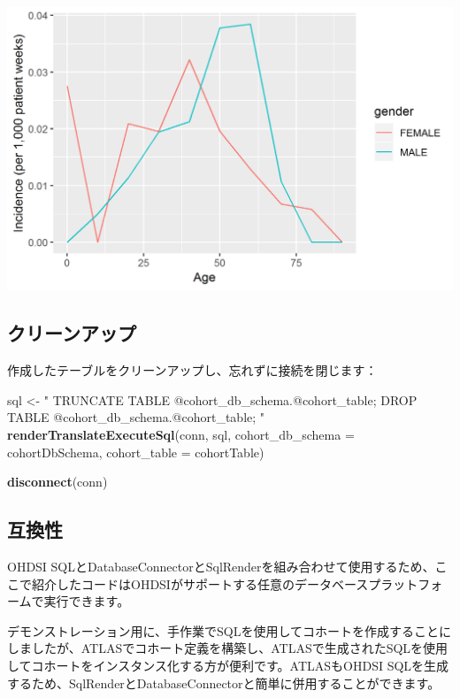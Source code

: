 \documentclass[
  11pt]{book}
\newenvironment{Shaded}{\begin{snugshade}}{\end{snugshade}}
\newcommand{\AttributeTok}[1]{\textcolor[rgb]{0.13,0.29,0.53}{#1}}
\newcommand{\FunctionTok}[1]{\textcolor[rgb]{0.13,0.29,0.53}{\textbf{#1}}}
\newcommand{\NormalTok}[1]{#1}
\newcommand{\OtherTok}[1]{\textcolor[rgb]{0.56,0.35,0.01}{#1}}
\newcommand{\StringTok}[1]{\textcolor[rgb]{0.31,0.60,0.02}{#1}}
\theoremstyle{definition}
\theoremstyle{definition}
\theoremstyle{definition}
\theoremstyle{definition}
\theoremstyle{remark}
\begin{document}
\begin{center}\includegraphics[width=0.8\linewidth]{images/SqlAndR/ir} \end{center}

\subsection{クリーンアップ}\label{ux30afux30eaux30fcux30f3ux30a2ux30c3ux30d7}

作成したテーブルをクリーンアップし、忘れずに接続を閉じます：

\begin{Shaded}
\begin{Highlighting}[]
\NormalTok{sql }\OtherTok{\textless{}{-}} \StringTok{"}
\StringTok{TRUNCATE TABLE @cohort\_db\_schema.@cohort\_table;}
\StringTok{DROP TABLE @cohort\_db\_schema.@cohort\_table;}
\StringTok{"}
\FunctionTok{renderTranslateExecuteSql}\NormalTok{(conn, sql,}
                          \AttributeTok{cohort\_db\_schema =}\NormalTok{ cohortDbSchema,}
                          \AttributeTok{cohort\_table =}\NormalTok{ cohortTable)}

\FunctionTok{disconnect}\NormalTok{(conn)}
\end{Highlighting}
\end{Shaded}

\subsection{互換性}\label{ux4e92ux63dbux6027}

OHDSI SQLとDatabaseConnectorとSqlRenderを組み合わせて使用するため、ここで紹介したコードはOHDSIがサポートする任意のデータベースプラットフォームで実行できます。

デモンストレーション用に、手作業でSQLを使用してコホートを作成することにしましたが、ATLASでコホート定義を構築し、ATLASで生成されたSQLを使用してコホートをインスタンス化する方が便利です。ATLASもOHDSI SQLを生成するため、SqlRenderとDatabaseConnectorと簡単に併用することができます。
\end{document}
